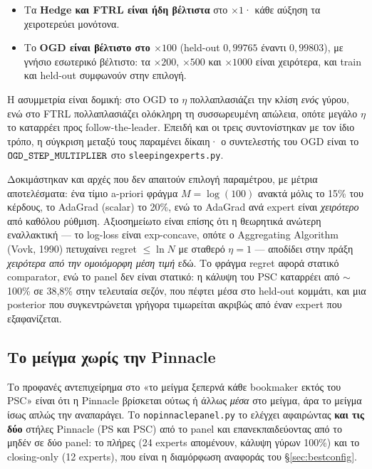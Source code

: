 \documentclass[11pt,a4paper]{article}
\newcommand{\file}[1]{\texttt{#1}}
\newcommand{\var}[1]{\texttt{#1}}
\renewcommand{\_}{\oldunderscore\allowbreak}
\begin{document}
\begin{itemize}
  \item Τα \textbf{Hedge και FTRL είναι ήδη βέλτιστα} στο $\times 1$· κάθε αύξηση τα
        χειροτερεύει μονότονα.
  \item Το \textbf{OGD είναι βέλτιστο στο $\times 100$} (held-out $0{,}99765$ έναντι
        $0{,}99803$), με γνήσιο εσωτερικό βέλτιστο: τα $\times 200$, $\times 500$ και
        $\times 1000$ είναι χειρότερα, και train και held-out συμφωνούν στην επιλογή.
\end{itemize}

Η ασυμμετρία είναι δομική: στο OGD το $\eta$ πολλαπλασιάζει την κλίση \emph{ενός} γύρου, ενώ
στο FTRL πολλαπλασιάζει ολόκληρη τη συσσωρευμένη απώλεια, οπότε μεγάλο $\eta$ το καταρρέει
προς follow-the-leader. Επειδή και οι τρεις συντονίστηκαν με τον ίδιο τρόπο, η σύγκριση
μεταξύ τους παραμένει δίκαιη· ο συντελεστής του OGD είναι το
$\var{OGD\_STEP\_MULTIPLIER}$ στο \file{sleeping\_experts.py}.

Δοκιμάστηκαν και αρχές που δεν απαιτούν επιλογή παραμέτρου, με μέτρια αποτελέσματα: ένα
τίμιο a-priori φράγμα $M=\log(100)$ ανακτά μόλις το 15\% του κέρδους, το AdaGrad (scalar) το
20\%, ενώ το AdaGrad ανά expert είναι \emph{χειρότερο} από καθόλου ρύθμιση. Αξιοσημείωτο
είναι επίσης ότι η θεωρητικά ανώτερη εναλλακτική --- το log-loss είναι exp-concave, οπότε ο
Aggregating Algorithm (Vovk, 1990) πετυχαίνει regret $\le \ln N$ με σταθερό $\eta=1$ ---
αποδίδει στην πράξη \emph{χειρότερα από την ομοιόμορφη μέση τιμή} εδώ. Το φράγμα regret
αφορά στατικό comparator, ενώ το panel δεν είναι στατικό: η κάλυψη του PSC καταρρέει από
$\sim$100\% σε 38{,}8\% στην τελευταία σεζόν, που πέφτει μέσα στο held-out κομμάτι, και μια
posterior που συγκεντρώνεται γρήγορα τιμωρείται ακριβώς από έναν expert που εξαφανίζεται.

\subsection{Το μείγμα χωρίς την Pinnacle}
\label{sec:nopinnacle}

Το προφανές αντεπιχείρημα στο «το μείγμα ξεπερνά κάθε bookmaker εκτός του PSC» είναι ότι η
Pinnacle βρίσκεται ούτως ή άλλως \emph{μέσα} στο μείγμα, άρα το μείγμα ίσως απλώς την
αναπαράγει. Το \file{no\_pinnacle\_panel.py} το ελέγχει αφαιρώντας \textbf{και τις δύο}
στήλες Pinnacle (PS και PSC) από το panel και επανεκπαιδεύοντας από το μηδέν σε δύο panel:
το πλήρες (24 experts απομένουν, κάλυψη γύρων 100\%) και το closing-only (12 experts), που
είναι η διαμόρφωση αναφοράς του \S\ref{sec:bestconfig}.
\end{document}
